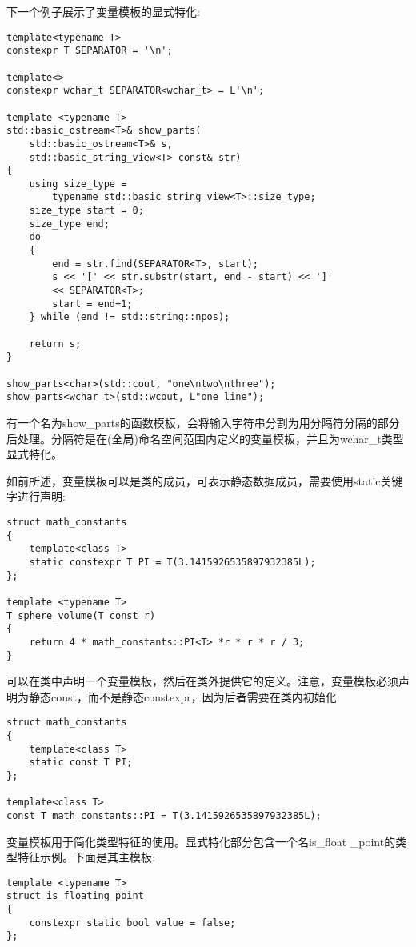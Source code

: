 下一个例子展示了变量模板的显式特化:

\begin{lstlisting}[style=styleCXX]
template<typename T>
constexpr T SEPARATOR = '\n';

template<>
constexpr wchar_t SEPARATOR<wchar_t> = L'\n';

template <typename T>
std::basic_ostream<T>& show_parts(
	std::basic_ostream<T>& s,
	std::basic_string_view<T> const& str)
{
	using size_type =
		typename std::basic_string_view<T>::size_type;
	size_type start = 0;
	size_type end;
	do
	{
		end = str.find(SEPARATOR<T>, start);
		s << '[' << str.substr(start, end - start) << ']'
		<< SEPARATOR<T>;
		start = end+1;
	} while (end != std::string::npos);

	return s;
}

show_parts<char>(std::cout, "one\ntwo\nthree");
show_parts<wchar_t>(std::wcout, L"one line");
\end{lstlisting}

有一个名为show\_parts的函数模板，会将输入字符串分割为用分隔符分隔的部分后处理。分隔符是在(全局)命名空间范围内定义的变量模板，并且为wchar\_t类型显式特化。

如前所述，变量模板可以是类的成员，可表示静态数据成员，需要使用static关键字进行声明:

\begin{lstlisting}[style=styleCXX]
struct math_constants
{
	template<class T>
	static constexpr T PI = T(3.1415926535897932385L);
};

template <typename T>
T sphere_volume(T const r)
{
	return 4 * math_constants::PI<T> *r * r * r / 3;
}
\end{lstlisting}

可以在类中声明一个变量模板，然后在类外提供它的定义。注意，变量模板必须声明为静态const，而不是静态constexpr，因为后者需要在类内初始化:

\begin{lstlisting}[style=styleCXX]
struct math_constants
{
	template<class T>
	static const T PI;
};

template<class T>
const T math_constants::PI = T(3.1415926535897932385L);
\end{lstlisting}

变量模板用于简化类型特征的使用。显式特化部分包含一个名is\_float \_point的类型特征示例。下面是其主模板:

\begin{lstlisting}[style=styleCXX]
template <typename T>
struct is_floating_point
{
	constexpr static bool value = false;
};
\end{lstlisting}

